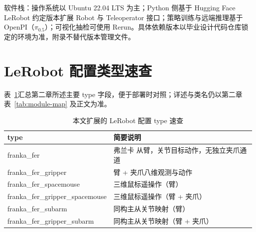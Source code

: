 \begin{appendices}
软件栈：操作系统以 Ubuntu 22.04 LTS 为主；Python 侧基于 Hugging Face LeRobot 约定版本扩展 Robot 与 Teleoperator 接口；策略训练与远端推理基于 OpenPI（$\pi_{0.5}$）；可视化抽检可使用 Rerun。具体依赖版本以毕业设计代码仓库锁定的环境为准，附录不替代版本管理文件。

\section{LeRobot 配置类型速查}

表~\ref{tab:appendix-lerobot-types}汇总第二章所述主要 type 字段，便于部署时对照；详述与类名仍以第二章表~\ref{tab:module-map} 及正文为准。

\begin{table}[htbp]
  \centering
  \small
  \caption{本文扩展的 LeRobot 配置 type 速查}
  \label{tab:appendix-lerobot-types}
  \begin{tabular}{>{\raggedright\arraybackslash}p{6.6cm}>{\raggedright\arraybackslash}p{7.4cm}}
    \toprule
    type & 简要说明 \\
    \midrule
    franka\_fer & 弗兰卡 从臂，关节目标动作，无独立夹爪通道 \\
    franka\_fer\_gripper & 臂 + 夹爪八维观测与动作 \\
    franka\_fer\_spacemouse & 三维鼠标遥操作（臂） \\
    franka\_fer\_gripper\_spacemouse & 三维鼠标遥操作（臂 + 夹爪） \\
    franka\_fer\_subarm & 同构主从关节映射（臂） \\
    franka\_fer\_gripper\_subarm & 同构主从关节映射（臂 + 夹爪） \\
    \bottomrule
  \end{tabular}
\end{table}

\end{appendices}
